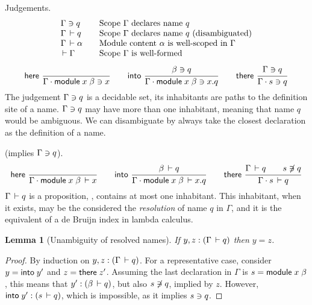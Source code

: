 \documentclass{article}
\theoremstyle{definition}
\theoremstyle{plain}
\newtheorem{lemma}{Lemma}
\theoremstyle{remark}
\begin{document}
Judgements.
\[
\begin{array}{l@{\qquad}l}
  \Contains \Gamma q & \mbox{Scope $\Gamma$ declares name $q$} \\
  \Declares \Gamma q & \mbox{Scope $\Gamma$ declares name $q$ (disambiguated)} \\
  \WContent \Gamma \alpha & \mbox{Module content $\alpha$ is well-scoped in $\Gamma$}\\
  \WScope \Gamma & \mbox{Scope $\Gamma$ is well-formed}
\end{array}
\]
\begin{gather*}
  \nru{\rhere
     }{
     }{\Contains {\Gamma \chop \mdef x \beta} x}
\qquad
  \nru{\rinto
     }{\Contains \beta q
     }{\Contains {\Gamma \chop \mdef x \beta} {x.q}}
\qquad
   \nru{\rthere
      }{\Contains \Gamma q
      }{\Contains {\Gamma \chop s} q}
\end{gather*}
The judgement $\Gamma\ni q$ is a decidable set, its inhabitants
are paths to the definition site of a name.
$\Gamma\ni q$ may have more than one inhabitant, meaning that
name $q$ would be ambiguous.
We can disambiguate by always take the closest declaration as the
definition of a name.

 (implies $\Gamma\ni q$).
\begin{gather*}
  \nru{\rhere
     }{
     }{\Declares {\Gamma \chop \mdef x \beta} x}
\qquad
  \nru{\rinto
     }{\Declares \beta q
     }{\Declares {\Gamma \chop \mdef x \beta} {x.q}}
\qquad
   \nru{\rthere
      }{\Declares \Gamma q \qquad \NotContains s q
      }{\Declares {\Gamma \chop s} q}
\end{gather*}
$\Gamma\,\vdash q$ is a proposition, \ie, contains at most one
inhabitant.  This inhabitant, when it exists, may be the considered
the \emph{resolution} of name $q$ in $\Gamma$, and it is the
equivalent of a de Bruijn index in lambda calculus.
\begin{lemma}[Unambiguity of resolved names]
  If $y,z : (\Gamma\,\vdash q)$ then $y = z$.
\end{lemma}
\begin{proof}
  By induction on $y,z : (\Gamma\,\vdash q)$.
  For a representative case, consider
  $y = \mathsf{into}\;y'$ and $z = \mathsf{there}\;z'$.
  Assuming the last declaration in $\Gamma$ is $s = \mathsf{module}\;x\;\beta$,
  this means that $y' : (\beta\,\vdash q)$,
  but also $s\not\owns q$, implied by $z$.  However,
  $\mathsf{into}\;y' : (s\,\vdash q)$, which is impossible, as it implies
  $s\ni q$.
\end{proof}
\end{document}
